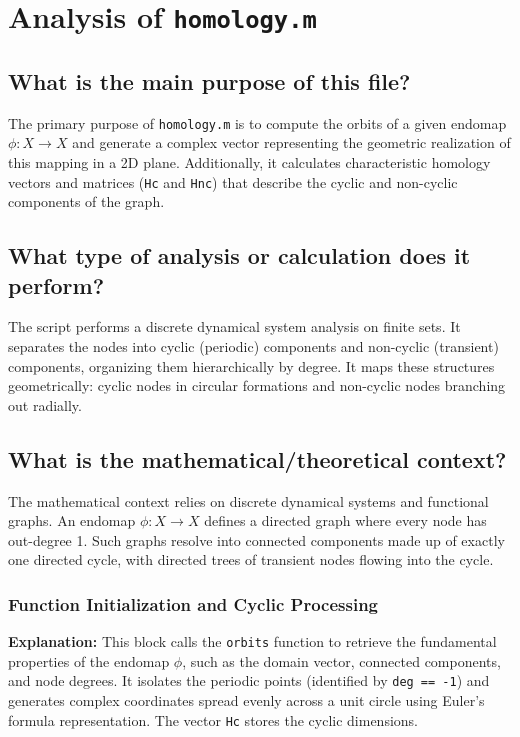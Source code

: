 
\chapter{Analysis of \texttt{homology.m}}

\section{What is the main purpose of this file?}
The primary purpose of \texttt{homology.m} is to compute the orbits of a given endomap $\phi : X \to X$ and generate a complex vector representing the geometric realization of this mapping in a 2D plane. Additionally, it calculates characteristic homology vectors and matrices (\texttt{Hc} and \texttt{Hnc}) that describe the cyclic and non-cyclic components of the graph. 

\section{What type of analysis or calculation does it perform?}
The script performs a discrete dynamical system analysis on finite sets. It separates the nodes into cyclic (periodic) components and non-cyclic (transient) components, organizing them hierarchically by degree. It maps these structures geometrically: cyclic nodes in circular formations and non-cyclic nodes branching out radially.

\section{What is the mathematical/theoretical context?}
The mathematical context relies on discrete dynamical systems and functional graphs. An endomap $\phi: X \to X$ defines a directed graph where every node has out-degree 1. Such graphs resolve into connected components made up of exactly one directed cycle, with directed trees of transient nodes flowing into the cycle. 

\subsection{Function Initialization and Cyclic Processing}
\textbf{Explanation:} 
This block calls the \texttt{orbits} function to retrieve the fundamental properties of the endomap $\phi$, such as the domain vector, connected components, and node degrees. It isolates the periodic points (identified by \texttt{deg == -1}) and generates complex coordinates spread evenly across a unit circle using Euler's formula representation. The vector \texttt{Hc} stores the cyclic dimensions.

